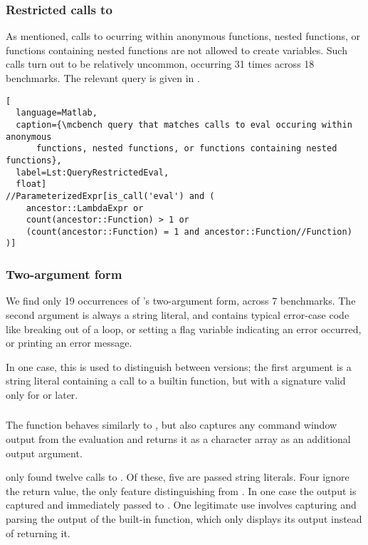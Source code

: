 \subsubsection{Restricted calls to }

As mentioned, calls to  ocurring within anonymous functions, nested
functions, or functions containing nested functions are not allowed to create
variables. Such calls turn out to be relatively uncommon, occurring 31 times
across 18 benchmarks. The relevant query is given in
.

\begin{lstlisting}[
  language=Matlab,
  caption={\mcbench query that matches calls to eval occuring within anonymous
      functions, nested functions, or functions containing nested functions},
  label=Lst:QueryRestrictedEval,
  float]
//ParameterizedExpr[is_call('eval') and (
    ancestor::LambdaExpr or
    count(ancestor::Function) > 1 or
    (count(ancestor::Function) = 1 and ancestor::Function//Function)
)]
\end{lstlisting}

\subsubsection{Two-argument form}

We find only 19 occurrences of 's two-argument form, across 7
benchmarks. The second argument is always a string literal, and contains
typical error-case code like breaking out of a loop, or setting a flag variable
indicating an error occurred, or printing an error message.

In one case, this is used to distinguish between \matlab versions; the first
argument is a string literal containing a call to a builtin function, but with
a signature valid only for  or later.

\subsubsection{}

The  function behaves similarly to , but also captures
any command window output from the evaluation and returns it as a character
array as an additional output argument.

\mcbench only found twelve calls to . Of these, five are passed
string literals. Four ignore the return value, the only feature distinguishing
 from . In one case the output is captured and
immediately passed to . One legitimate use involves capturing and
parsing the output of the \matlab built-in  function, which only
displays its output instead of returning it.

